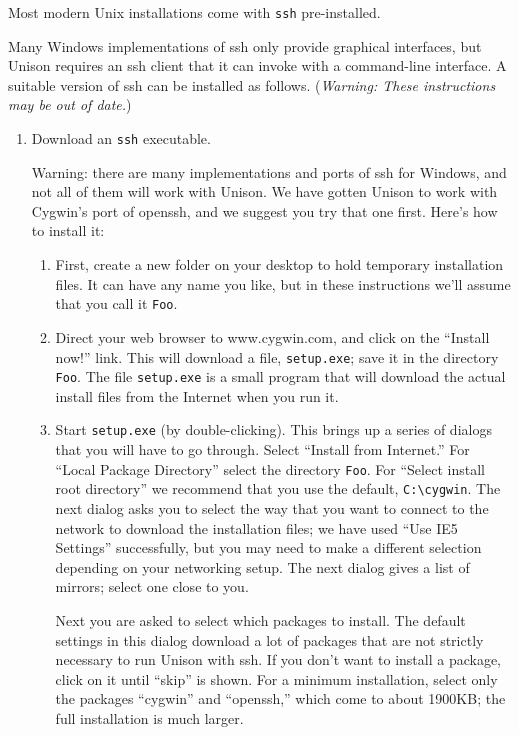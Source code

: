 \documentclass{article}
\begin{document}

Most modern Unix installations come with \verb|ssh| pre-installed.

Many Windows implementations of ssh only provide graphical interfaces,
but Unison requires an ssh client that it can invoke with a
command-line interface.  A suitable version of ssh can be installed as
follows.  ({\em Warning: These instructions may be out of date.}) 

\begin{enumerate}
\item Download an \verb|ssh| executable.  
  
Warning: there are many implementations and ports of ssh for
Windows, and not all of them will work with Unison.  We have gotten
Unison to work with Cygwin's port of openssh, and we suggest you try
that one first.  Here's how to install it:
\begin{enumerate}
\item First, create a new folder on your desktop to hold temporary
  installation files.  It can have any name you like, but in these
  instructions we'll assume that you call it \verb|Foo|.
\item Direct your web browser to www.cygwin.com, and click on the
  ``Install now!'' link.  This will download a file, \verb|setup.exe|;
  save it in the directory \verb|Foo|.  The file \verb|setup.exe| is a
  small program that will download the actual install files from
  the Internet when you run it.
\item Start \verb|setup.exe| (by double-clicking).  This brings up a
  series of dialogs that you will have to go through.  Select
  ``Install from Internet.''  For ``Local Package Directory'' select
  the directory \verb|Foo|.  For ``Select install root directory'' we
  recommend that you use the default, \verb|C:\cygwin|.  The next
  dialog asks you to select the way that you want to connect to the
  network to download the installation files; we have used ``Use IE5
  Settings'' successfully, but you may need to make a different
  selection depending on your networking setup.  The next dialog gives
  a list of mirrors; select one close to you.
  
  Next you are asked to select which packages to install.  The default
  settings in this dialog download a lot of packages that are not
  strictly necessary to run Unison with ssh.  If you don't want to
  install a package, click on it until ``skip'' is shown.  For a
  minimum installation, select only the packages ``cygwin'' and
  ``openssh,'' which come to about 1900KB; the full installation is
  much larger.  


\end{enumerate}
\end{enumerate}
\end{document}
